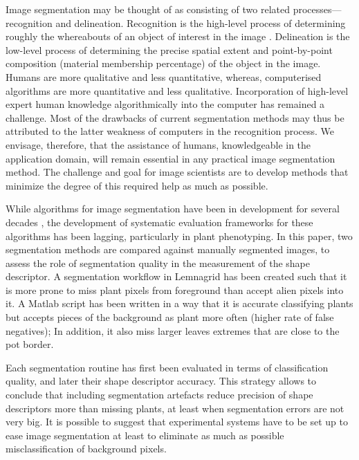 \documentclass{frontiersSCNS} %
\begin{document}
Image segmentation may be thought of as consisting of two related processes—recognition and delineation. Recognition is the high-level process of determining roughly the whereabouts of an object of interest in the image \cite{Udupa200675}. Delineation is the low-level process of determining the precise spatial extent and point-by-point composition (material membership percentage) of the object in the image. Humans are more qualitative and less quantitative, whereas, computerised algorithms are more quantitative and less qualitative. Incorporation of high-level expert human knowledge algorithmically into the computer has remained a challenge. Most of the drawbacks of current segmentation methods may thus be attributed to the latter weakness of computers in the recognition process. We envisage, therefore, that the assistance of humans, knowledgeable in the application domain, will remain essential in any practical image segmentation method. The challenge and goal for image scientists are to develop methods that minimize the degree of this required help as much as possible.

While algorithms for image segmentation have been in development for several decades \cite{ZAITOUN2015797}, the development of systematic evaluation frameworks for these algorithms has been lagging, particularly in plant phenotyping. In this paper, two segmentation methods are compared against manually segmented images, to assess the role of segmentation quality in the measurement of the shape descriptor. A segmentation workflow in Lemnagrid \cite{ISI:000245413900027} has been created such that it is more prone to miss plant pixels from foreground than accept alien pixels into it. A Matlab \cite{MATLAB:2010} script has been written in a way that it is accurate classifying plants but accepts pieces of the background as plant more often (higher rate of false negatives); In addition, it also miss larger leaves extremes that are close to the pot border.

Each segmentation routine has first been evaluated in terms of classification quality, and later their shape descriptor accuracy. This strategy allows to conclude that including segmentation artefacts reduce precision of shape descriptors more than missing plants, at least when segmentation errors are not very big. It is possible to suggest that experimental systems have to be set up to ease image segmentation at least to eliminate as much as possible misclassification of background pixels.

\end{document}

